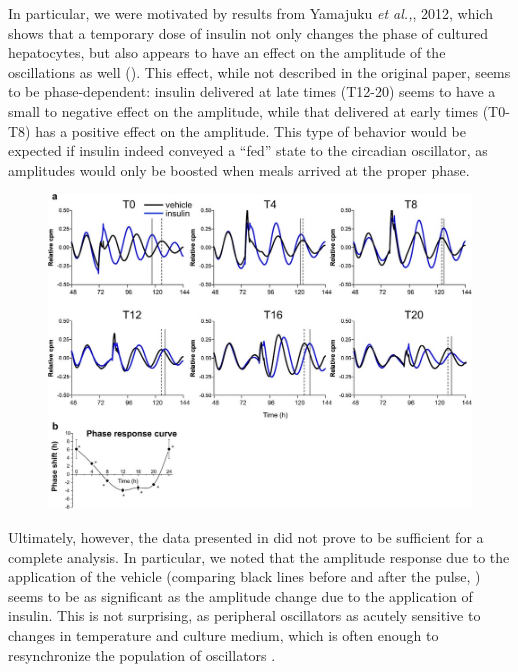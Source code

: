 In particular, we were motivated by results from Yamajuku {\itshape et al.,}, 2012, which shows that a temporary dose of insulin not only changes the phase of cultured hepatocytes, but also appears to have an effect on the amplitude of the oscillations as well ().
This effect, while not described in the original paper, seems to be phase-dependent: insulin delivered at late times (T12-20) seems to have a small to negative effect on the amplitude, while that delivered at early times (T0-T8) has a positive effect on the amplitude.
This type of behavior would be expected if insulin indeed conveyed a ``fed'' state to the circadian oscillator, as amplitudes would only be boosted when meals arrived at the proper phase.

\begin{figure}[tbp]
  \centering
\includegraphics[width=\textwidth]{chap7/figures/yamajuku_arc.jpg}
  \label{fig:yamajuku}
\end{figure}

Ultimately, however, the data presented in \cite{Yamajuku2012} did not prove to be sufficient for a complete analysis.
In particular, we noted that the amplitude response due to the application of the vehicle (comparing black lines before and after the pulse, ) seems to be as significant as the amplitude change due to the application of insulin.
This is not surprising, as peripheral oscillators as acutely sensitive to changes in temperature and culture medium, which is often enough to resynchronize the population of oscillators \cite{Izumo2006}.

